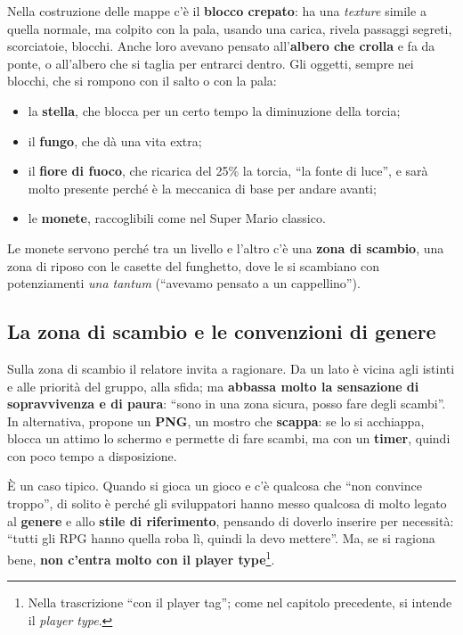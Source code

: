 Nella costruzione delle mappe c'è il \textbf{blocco crepato}: ha una
\emph{texture} simile a quella normale, ma colpito con la pala, usando una carica,
rivela passaggi segreti, scorciatoie, blocchi. Anche loro avevano pensato
all'\textbf{albero che crolla} e fa da ponte, o all'albero che si taglia per entrarci
dentro. Gli oggetti, sempre nei blocchi, che si rompono con il salto o con la pala:
\begin{itemize}
  \item la \textbf{stella}, che blocca per un certo tempo la diminuzione della
        torcia;
  \item il \textbf{fungo}, che dà una vita extra;
  \item il \textbf{fiore di fuoco}, che ricarica del 25\% la torcia, ``la fonte di
        luce'', e sarà molto presente perché è la meccanica di base per andare
        avanti;
  \item le \textbf{monete}, raccoglibili come nel Super Mario classico.
\end{itemize}
Le monete servono perché tra un livello e l'altro c'è una \textbf{zona di scambio}, una
zona di riposo con le casette del funghetto, dove le si scambiano con potenziamenti
\emph{una tantum} (``avevamo pensato a un cappellino'').

\subsection{La zona di scambio e le convenzioni di genere}

Sulla zona di scambio il relatore invita a ragionare. Da un lato è vicina agli
istinti e alle priorità del gruppo, alla sfida; ma \textbf{abbassa molto la sensazione
di sopravvivenza e di paura}: ``sono in una zona sicura, posso fare degli scambi''.
In alternativa, propone un \textbf{PNG}, un mostro che \textbf{scappa}: se lo si
acchiappa, blocca un attimo lo schermo e permette di fare scambi, ma con un
\textbf{timer}, quindi con poco tempo a disposizione.

È un caso tipico. Quando si gioca un gioco e c'è qualcosa che ``non convince
troppo'', di solito è perché gli sviluppatori hanno messo qualcosa di molto legato al
\textbf{genere} e allo \textbf{stile di riferimento}, pensando di doverlo inserire per
necessità: ``tutti gli RPG hanno quella roba lì, quindi la devo mettere''. Ma, se si
ragiona bene, \textbf{non c'entra molto con il player type}\footnote{Nella
trascrizione ``con il player tag''; come nel capitolo precedente, si intende il
\emph{player type}.}.

